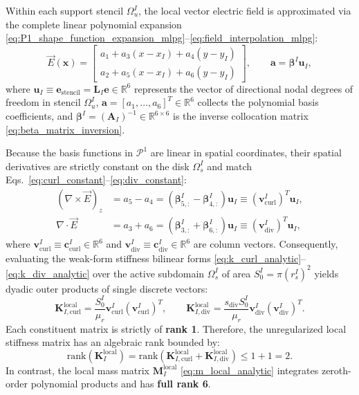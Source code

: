 \documentclass[preprint,12pt]{elsarticle}
\begin{document}
Within each support stencil $\Omega_u^I$, the local vector electric field is approximated via the complete linear polynomial expansion \eqref{eq:P1_shape_function_expansion_mlpg}--\eqref{eq:field_interpolation_mlpg}:
\begin{equation}
    \vec{E}(\mathbf{x}) = \begin{bmatrix} a_1 + a_3 (x - x_I) + a_4 (y - y_I) \\ a_2 + a_5 (x - x_I) + a_6 (y - y_I) \end{bmatrix}, \qquad \mathbf{a} = \boldsymbol{\beta}^I \mathbf{u}_I,
    \label{eq:p1_field_vector_expanded}
\end{equation}
where $\mathbf{u}_I \equiv \mathbf{e}_{\mathrm{stencil}} = \mathbf{L}_I \mathbf{e} \in \mathbb{R}^6$ represents the vector of directional nodal degrees of freedom in stencil $\Omega_u^I$, $\mathbf{a} = [a_1, \dots, a_6]^T \in \mathbb{R}^6$ collects the polynomial basis coefficients, and $\boldsymbol{\beta}^I = (\mathbf{A}_I)^{-1} \in \mathbb{R}^{6 \times 6}$ is the inverse collocation matrix \eqref{eq:beta_matrix_inversion}.

Because the basis functions in $\mathcal{P}^1$ are linear in spatial coordinates, their spatial derivatives are strictly constant on the disk $\Omega_s^I$ and match Eqs.~\eqref{eq:curl_constant}--\eqref{eq:div_constant}:
\begin{align}
    (\nabla \times \vec{E})_z & = a_5 - a_4 = (\boldsymbol{\beta}_{5, :}^I - \boldsymbol{\beta}_{4, :}^I) \mathbf{u}_I \equiv (\mathbf{v}_{\mathrm{curl}}^I)^T \mathbf{u}_I, \\
    \nabla \cdot \vec{E}      & = a_3 + a_6 = (\boldsymbol{\beta}_{3, :}^I + \boldsymbol{\beta}_{6, :}^I) \mathbf{u}_I \equiv (\mathbf{v}_{\mathrm{div}}^I)^T \mathbf{u}_I,
\end{align}
where $\mathbf{v}_{\mathrm{curl}}^I \equiv \mathbf{c}_{\mathrm{curl}}^I \in \mathbb{R}^6$ and $\mathbf{v}_{\mathrm{div}}^I \equiv \mathbf{c}_{\mathrm{div}}^I \in \mathbb{R}^6$ are column vectors.
Consequently, evaluating the weak-form stiffness bilinear forms \eqref{eq:k_curl_analytic}--\eqref{eq:k_div_analytic} over the active subdomain $\Omega_s^I$ of area $S_0^I = \pi (r_s^I)^2$ yields dyadic outer products of single discrete vectors:
\begin{equation}
    \mathbf{K}_{I, \mathrm{curl}}^{\mathrm{local}} = \frac{S_0^I}{\mu_r} \mathbf{v}_{\mathrm{curl}}^I (\mathbf{v}_{\mathrm{curl}}^I)^T, \qquad
    \mathbf{K}_{I, \mathrm{div}}^{\mathrm{local}} = \frac{s_{\mathrm{div}} S_0^I}{\mu_r} \mathbf{v}_{\mathrm{div}}^I (\mathbf{v}_{\mathrm{div}}^I)^T.
\end{equation}
Each constituent matrix is strictly of \textbf{rank 1}. Therefore, the unregularized local stiffness matrix has an algebraic rank bounded by:
\begin{equation}
    \mathrm{rank}(\mathbf{K}_I^{\mathrm{local}}) = \mathrm{rank}\left(\mathbf{K}_{I, \mathrm{curl}}^{\mathrm{local}} + \mathbf{K}_{I, \mathrm{div}}^{\mathrm{local}}\right) \le 1 + 1 = 2.
    \label{eq:stiffness_rank_deficiency}
\end{equation}
In contrast, the local mass matrix $\mathbf{M}_I^{\mathrm{local}}$ \eqref{eq:m_local_analytic} integrates zeroth-order polynomial products and has \textbf{full rank 6}.
\end{document}
